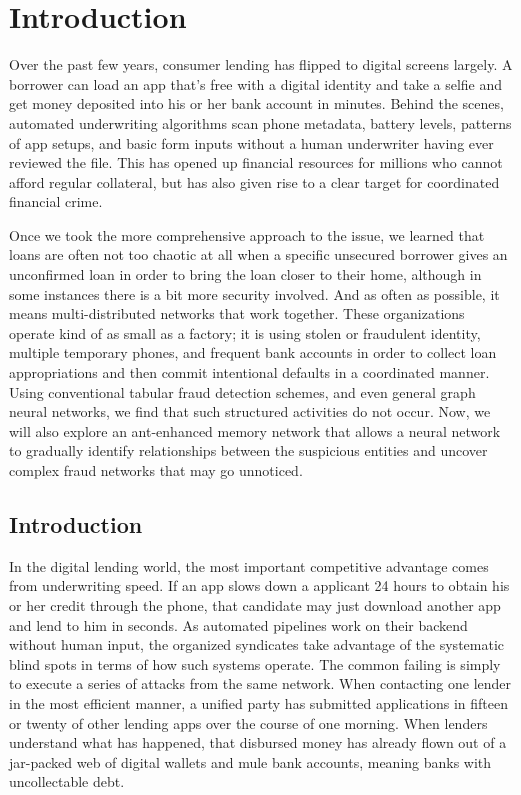 \chapter{Introduction}
\label{ch:intro}

Over the past few years, consumer lending has flipped to digital screens largely. A borrower can load an app that's free with a digital identity and take a selfie and get money deposited into his or her bank account in minutes. Behind the scenes, automated underwriting algorithms scan phone metadata, battery levels, patterns of app setups, and basic form inputs without a human underwriter having ever reviewed the file. This has opened up financial resources for millions who cannot afford regular collateral, but has also given rise to a clear target for coordinated financial crime. 

Once we took the more comprehensive approach to the issue, we learned that loans are often not too chaotic at all when a specific unsecured borrower gives an unconfirmed loan in order to bring the loan closer to their home, although in some instances there is a bit more security involved. And as often as possible, it means multi-distributed networks that work together. These organizations operate kind of as small as a factory; it is using stolen or fraudulent identity, multiple temporary phones, and frequent bank accounts in order to collect loan appropriations and then commit intentional defaults in a coordinated manner. Using conventional tabular fraud detection schemes, and even general graph neural networks, we find that such structured activities do not occur. Now, we will also explore an ant-enhanced memory network that allows a neural network to gradually identify relationships between the suspicious entities and uncover complex fraud networks that may go unnoticed.

\section[Introduction]{\textbf{Introduction}}
\label{sec:background_context}

In the digital lending world, the most important competitive advantage comes from underwriting speed. If an app slows down a applicant 24 hours to obtain his or her credit through the phone, that candidate may just download another app and lend to him in seconds. As automated pipelines work on their backend without human input, the organized syndicates take advantage of the systematic blind spots in terms of how such systems operate. The common failing is simply to execute a series of attacks from the same network. When contacting one lender in the most efficient manner, a unified party has submitted applications in fifteen or twenty of other lending apps over the course of one morning. When lenders understand what has happened, that disbursed money has already flown out of a jar-packed web of digital wallets and mule bank accounts, meaning banks with uncollectable debt. 

